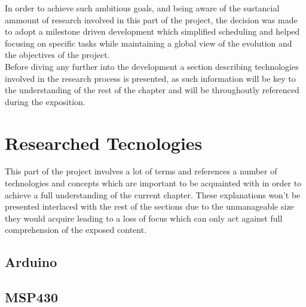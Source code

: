 	In order to achieve such ambitious goals, and being aware of the sustancial ammount of research involved in this part of the project, the decision was made to adopt a milestone driven development which simplified scheduling and helped focusing on specific tasks while maintaining a global view of the evolution and the objectives of the project.\\


	Before diving any further into the development a section describing technologies involved in the research process is presented, as such information will be key to the understanding of the rest of the chapter and will be throughoutly referenced during the exposition.

	\section{Researched Tecnologies}


	This part of the project involves a lot of terms and references a number of technologies and concepts which are important to be acquainted with in order to achieve a full understanding of the current chapter. These explanations won't be presented interlaced with the rest of the sections due to the unmanageable size they would acquire leading to a loss of focus which can only act against full comprehension of the exposed content.

		\subsection{Arduino}
		\subsection{MSP430}
